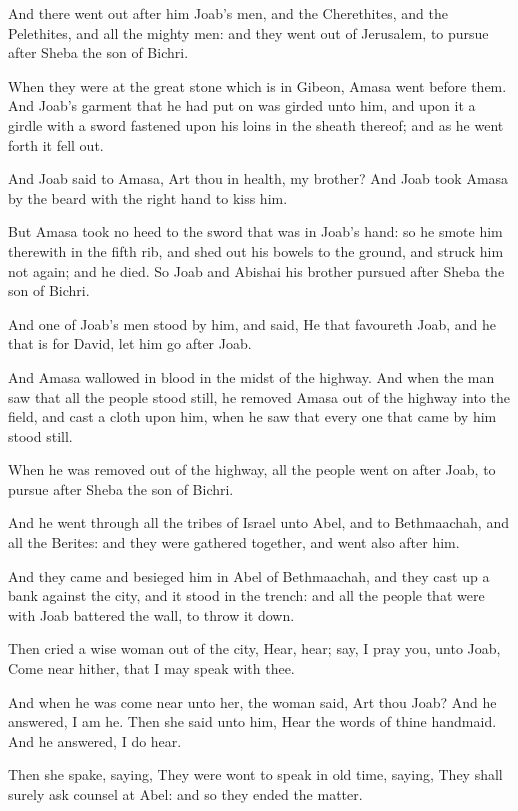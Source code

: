 \Verse And there went out after him Joab's men, and the Cherethites, and the Pelethites, and all the mighty men: and they went out of Jerusalem, to pursue after Sheba the son of Bichri.

\Verse When they were at the great stone which is in Gibeon, Amasa went before them. And Joab's garment that he had put on was girded unto him, and upon it a girdle with a sword fastened upon his loins in the sheath thereof; and as he went forth it fell out.

\Verse And Joab said to Amasa, Art thou in health, my brother? And Joab took Amasa by the beard with the right hand to kiss him.

\Verse But Amasa took no heed to the sword that was in Joab's hand: so he smote him therewith in the fifth rib, and shed out his bowels to the ground, and struck him not again; and he died. So Joab and Abishai his brother pursued after Sheba the son of Bichri.

\Verse And one of Joab's men stood by him, and said, He that favoureth Joab, and he that is for David, let him go after Joab.

\Verse And Amasa wallowed in blood in the midst of the highway. And when the man saw that all the people stood still, he removed Amasa out of the highway into the field, and cast a cloth upon him, when he saw that every one that came by him stood still.

\Verse When he was removed out of the highway, all the people went on after Joab, to pursue after Sheba the son of Bichri.

\Verse And he went through all the tribes of Israel unto Abel, and to Bethmaachah, and all the Berites: and they were gathered together, and went also after him.

\Verse And they came and besieged him in Abel of Bethmaachah, and they cast up a bank against the city, and it stood in the trench: and all the people that were with Joab battered the wall, to throw it down.

\Verse Then cried a wise woman out of the city, Hear, hear; say, I pray you, unto Joab, Come near hither, that I may speak with thee.

\Verse And when he was come near unto her, the woman said, Art thou Joab?  And he answered, I am he. Then she said unto him, Hear the words of thine handmaid. And he answered, I do hear.

\Verse Then she spake, saying, They were wont to speak in old time, saying, They shall surely ask counsel at Abel: and so they ended the matter.

